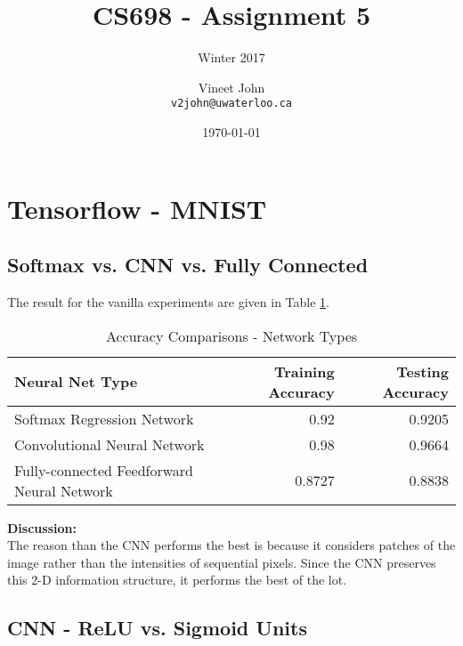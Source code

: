 \documentclass[parskip=half]{scrartcl}
\begin{document}
\title{CS698 - Assignment 5}
\subtitle{Winter 2017}
\author{
    Vineet John\\
    \texttt{v2john@uwaterloo.ca}
}
\date{\today}
\maketitle


\section{Tensorflow - MNIST} %
\label{sec:tensorflow_mnist}

    \subsection{Softmax vs. CNN vs. Fully Connected} %
    \label{sub:softmax_vs_cnn_vs_fully_connected}

        The result for the vanilla experiments are given in Table \ref{tab:accuracy_comparisons_network_types}.
        \begin{table}[th]
            \centering
            \begin{tabular}{| l | r | r |}
            \hline
            \textbf{Neural Net Type} & \textbf{Training Accuracy} & \textbf{Testing Accuracy} \\
            \hline
                \hline
                Softmax Regression Network & 0.92 & 0.9205 \\
                \hline
                Convolutional Neural Network & 0.98 & 0.9664 \\
                \hline
                Fully-connected Feedforward Neural Network & 0.8727 & 0.8838 \\
            \hline
            \end{tabular}
            \caption{Accuracy Comparisons - Network Types}
            \label{tab:accuracy_comparisons_network_types}
        \end{table}

        \textbf{Discussion:}\\
        The reason than the CNN performs the best is because it considers patches of the image rather than the intensities of sequential pixels. Since the CNN preserves this 2-D information structure, it performs the best of the lot.
    

    \subsection{CNN - ReLU vs. Sigmoid Units} %
    \label{sub:cnn_relu_vs_sigmoid_units}
\end{document}
